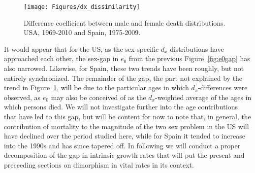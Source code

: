 \begin{figure}[!ht]
  \centering
    \caption{Difference coefficient between male and female death distributions.
    USA, 1969-2010 and Spain, 1975-2009.}
     \texttt{[image: Figures/dx\_dissimilarity]}
     \label{fig:dxtheta}
\end{figure}

It would appear that for the US, as the sex-specific $d_x$ distributions have
approached each other, the sex-gap in $e_0$ from the previous
Figure~\ref{fig:e0gap} has also narrowed. Likewise, for Spain, these two trends
have been roughly, but not entirely synchronized. The remainder of the gap, the
part not explained by the trend in Figure~\ref{fig:dxtheta}, will be due to the
particular ages in which $d_x$-differences were observed, as $e_0$ may also be
conceived of as the $d_x$-weighted average of the ages in which persons died. We
will not investigate further into the age contributions that have led to this
gap, but will be content for now to note that, in general, the
contribution of mortality to the magnitude of the two sex problem in the US will
have declined over the period studied here, while for Spain it tended to
increase into the 1990s and has since tapered off. In following we will conduct
a proper decomposition of the gap in intrinsic growth rates that will put the
present and preceeding sections on dimorphism in vital rates in its context.


 \FloatBarrier
